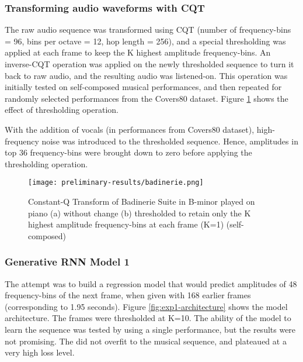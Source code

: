 \documentclass[../main.tex]{subfiles}
\begin{document}
\subsubsection{Transforming audio waveforms with \gls{CQT}}

\par
The raw audio sequence was transformed using \gls{CQT} (number of frequency-bins = 96, bins per octave = 12, hop length = 256), and a special thresholding was applied at each frame to keep the K highest amplitude frequency-bins. An inverse-\gls{CQT} operation was applied on the newly thresholded sequence to turn it back to raw audio, and the resulting audio was listened-on. This operation was initially tested on self-composed musical performances, and then repeated for randomly selected performances from the Covers80 dataset. Figure \ref{fig:badinerie} shows the effect of thresholding operation.

\par
With the addition of vocals (in performances from Covers80 dataset), high-frequency noise was introduced to the thresholded sequence. Hence, amplitudes in top 36 frequency-bins were brought down to zero before applying the thresholding operation.

\begin{figure}[H]
    \centering
    \texttt{[image: preliminary-results/badinerie.png]}
    \caption{Constant-Q Transform of Badinerie Suite in B-minor played on piano (a) without change (b) thresholded to retain only the K highest amplitude frequency-bins at each frame (K=1) (self-composed) }
    \label{fig:badinerie}
\end{figure}

\iffalse
\begin{figure}[H]
    \centering
    \texttt{[image: preliminary-results/c-major-scale.png]}
    \caption{Constant-Q Transform of ascending and descending the C-major scale, thresholded to retain only the highest K amplitude frequency-bins at each frame (K=1 here) }
    \label{fig:c-major-scale}
\end{figure}
\fi



\subsubsection{Generative RNN Model 1}

\par
The attempt was to build a regression model that would predict amplitudes of 48 frequency-bins of the next frame, when given with 168 earlier frames (corresponding to 1.95 seconds). Figure \ref{fig:exp1-architecture} shows the model architecture. The frames were thresholded at K=10. The ability of the model to learn the sequence was tested by using a single performance, but the results were not promising. The did not overfit to the musical sequence, and plateaued at a very high loss level.
\end{document}

